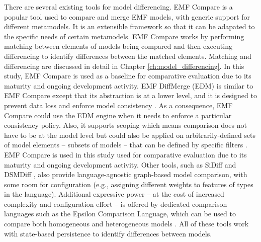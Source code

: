 There are several existing tools for model differencing. 
EMF Compare \cite{emfcompare2018developer} is a popular tool used to compare and merge EMF models, with generic support for different metamodels. It is an extensible framework so that it can be adapated to the specific needs of certain metamodels. EMF Compare works by performing matching between elements of models being compared and then executing differencing to identify differences between the matched elements. Matching and differencing are discussed in detail in Chapter \ref{ch:model_differencing}. In this study, EMF Compare is used as a baseline for comparative evaluation due to its maturity and ongoing development activity. EMF DiffMerge (EDM) \cite{eclipse2019emfdiffmerge} is similar to EMF Compare except that its abstraction is at a lower level, and it is designed to prevent data loss and enforce model consistency \cite{eclipse2019emfdiffmerge2}. As a consequence, EMF Compare could use the EDM engine when it needs to enforce a particular consistency policy. Also, it supports scoping which means comparison does not have to be at the model level but could also be applied on arbitrarily-defined sets of model elements -- subsets of models -- that can be defined by specific filters \cite{jaxenter2019emfdiffmerge}. EMF Compare is used in this study used for comparative evaluation due to its maturity and ongoing development activity. Other tools, such as SiDiff \cite{Treude2007SiDiff} and DSMDiff \cite{lin2009dsmdiff},  also provide language-agnostic graph-based model comparison, with some room for configuration (e.g., assigning different weights to features of types in the language). Additional expressive power -- at the cost of increased complexity and configuration effort -- is offered by dedicated comparison languages such as the Epsilon Comparison Language, which can be used to compare both homogeneous and heterogeneous models \cite{kolovos2009ecl}. All of these tools work with state-based persistence to identify differences between models.

